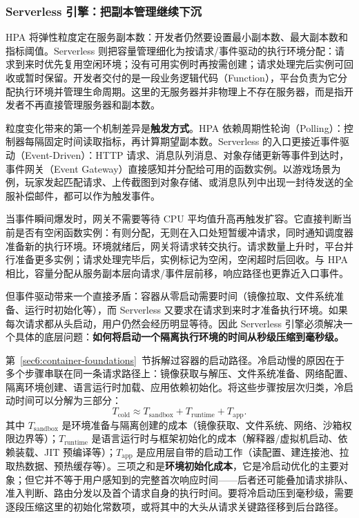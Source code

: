 \subsubsection{Serverless 引擎：把副本管理继续下沉}
\label{sec6:serverless-engine}

HPA 将弹性粒度定在服务副本数：开发者仍然要设置最小副本数、最大副本数和指标阈值。Serverless 则把容量管理细化为按请求/事件驱动的执行环境分配：请求到来时优先复用空闲环境；没有可用实例时再按需创建；请求处理完后实例可回收或暂时保留。开发者交付的是一段业务逻辑代码（Function），平台负责为它分配执行环境并管理生命周期。这里的无服务器并非物理上不存在服务器，而是指开发者不再直接管理服务器和副本数。

粒度变化带来的第一个机制差异是\textbf{触发方式}。HPA 依赖周期性轮询（Polling）：控制器每隔固定时间读取指标，再计算期望副本数。Serverless 的入口更接近事件驱动（Event-Driven）：HTTP 请求、消息队列消息、对象存储更新等事件到达时，事件网关（Event Gateway）直接感知并分配给可用的函数实例。以游戏场景为例，玩家发起匹配请求、上传截图到对象存储、或消息队列中出现一封待发送的全服补偿邮件，都可以作为触发事件。

当事件瞬间爆发时，网关不需要等待 CPU 平均值升高再触发扩容。它直接判断当前是否有空闲函数实例：有则分配，无则在入口处短暂缓冲请求，同时通知调度器准备新的执行环境。环境就绪后，网关将请求转交执行。请求数量上升时，平台并行准备更多实例；请求处理完毕后，实例标记为空闲，空闲超时后回收。与 HPA 相比，容量分配从服务副本层向请求/事件层前移，响应路径也更靠近入口事件。

但事件驱动带来一个直接矛盾：容器从零启动需要时间（镜像拉取、文件系统准备、运行时初始化等），而 Serverless 又要求在请求到来时才准备执行环境。如果每次请求都从头启动，用户仍然会经历明显等待。因此 Serverless 引擎必须解决一个具体的底层问题：\textbf{如何将启动一个隔离执行环境的时间从秒级压缩到毫秒级。}

第~\ref{sec6:container-foundations}~节拆解过容器的启动路径。冷启动慢的原因在于多个步骤串联在同一条请求路径上：镜像获取与解压、文件系统准备、网络配置、隔离环境创建、语言运行时加载、应用依赖初始化。将这些步骤按层次归类，冷启动时间可以分解为三部分：
\[
T_{\mathrm{cold}} \approx T_{\mathrm{sandbox}} + T_{\mathrm{runtime}} + T_{\mathrm{app}}.
\]
其中 $T_{\mathrm{sandbox}}$ 是环境准备与隔离创建的成本（镜像获取、文件系统、网络、沙箱权限边界等）；$T_{\mathrm{runtime}}$ 是语言运行时与框架初始化的成本（解释器/虚拟机启动、依赖装载、JIT 预编译等）；$T_{\mathrm{app}}$ 是应用层自带的启动工作（读配置、建连接池、拉取热数据、预热缓存等）。三项之和是\textbf{环境初始化成本}，它是冷启动优化的主要对象；但它并不等于用户感知到的完整首次响应时间——后者还可能叠加请求排队、准入判断、路由分发以及首个请求自身的执行时间。要将冷启动压到毫秒级，需要逐段压缩这里的初始化常数项，或将其中的大头从请求关键路径移到后台路径。

